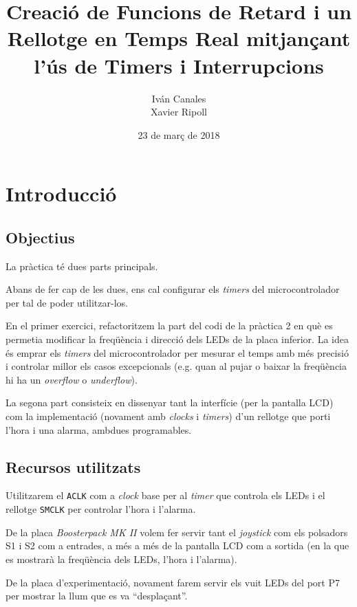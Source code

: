\documentclass[12pt,a4paper]{article}
\title{Creació de Funcions de Retard i un Rellotge en Temps Real mitjançant
l’ús de Timers i Interrupcions}
\author{
    Iván Canales\\
    Xavier Ripoll
}
\date{23 de març de 2018} %
\begin{document}
\maketitle
\pagebreak
\section{Introducció}

\subsection{Objectius}

La pràctica té dues parts principals.

Abans de fer cap de les dues, ens cal configurar els \textit{timers} del
microcontrolador per tal de poder utilitzar-los.

En el primer exercici, refactoritzem la part del
codi de la pràctica 2 en què es permetia modificar la freqüència i direcció
dels LEDs de la placa inferior. La idea és emprar els \textit{timers} del
microcontrolador per mesurar el temps amb més precisió i controlar millor
els casos excepcionals (e.g. quan al pujar o baixar la freqüència hi ha un
\textit{overflow} o \textit{underflow}).

La segona part consisteix en dissenyar tant la interfície (per la pantalla LCD)
com la implementació (novament amb \textit{clocks} i \textit{timers}) d'un
rellotge que porti l'hora i una alarma, ambdues programables.


\subsection{Recursos utilitzats}
Utilitzarem el \texttt{ACLK} com a \textit{clock} base per al \textit{timer}
que controla els LEDs i el rellotge \texttt{SMCLK} per controlar l'hora i
l'alarma.

De la placa \textit{Boosterpack MK II} volem fer servir tant el
\textit{joystick} com els polsadors S1 i S2 com a entrades, a més a més de la
pantalla LCD com a sortida (en la que es mostrarà la freqüència dels LEDs,
l'hora i l'alarma).

De la placa d'experimentació, novament farem servir els vuit LEDs del port P7
per mostrar la llum que es va ``desplaçant''.
\end{document}
